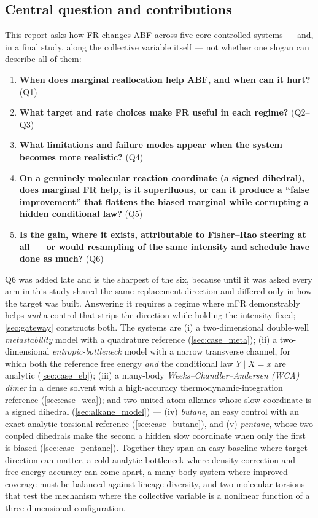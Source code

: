 \subsection{Central question and contributions}
This report asks how FR changes ABF across five core controlled systems --- and, in a
final study, along the collective variable itself --- not
whether one slogan can describe all of them:
\begin{enumerate}
  \item \textbf{When does marginal reallocation help ABF, and when can it hurt?}
        (Q1)
  \item \textbf{What target and rate choices make FR useful in each regime?}
        (Q2--Q3)
  \item \textbf{What limitations and failure modes appear when the system becomes
        more realistic?} (Q4)
  \item \textbf{On a genuinely molecular reaction coordinate (a signed dihedral),
        does marginal FR help, is it superfluous, or can it produce a ``false
        improvement'' that flattens the biased marginal while corrupting a hidden
        conditional law?} (Q5)
  \item \textbf{Is the gain, where it exists, attributable to Fisher--Rao steering at
        all --- or would resampling of the same intensity and schedule have done as
        much?} (Q6)
\end{enumerate}
Q6 was added late and is the sharpest of the six, because until it was asked every arm in
this study shared the same replacement direction and differed only in how the target was
built. Answering it requires a regime where mFR demonstrably helps \emph{and} a control
that strips the direction while holding the intensity fixed; \cref{sec:gateway} constructs
both.
The systems are (i) a two-dimensional double-well \emph{metastability} model
with a quadrature reference (\cref{sec:case_meta}); (ii) a two-dimensional
\emph{entropic-bottleneck} model with a narrow transverse channel, for which both
the reference free energy \emph{and} the conditional law $Y\mid X=x$ are analytic
(\cref{sec:case_eb}); (iii) a many-body \emph{Weeks--Chandler--Andersen
(WCA) dimer} in a dense solvent with a high-accuracy thermodynamic-integration
reference (\cref{sec:case_wca}); and two united-atom alkanes whose slow coordinate
is a signed dihedral (\cref{sec:alkane_model}) --- (iv) \emph{butane}, an easy
control with an exact analytic torsional reference (\cref{sec:case_butane}), and
(v) \emph{pentane}, whose two coupled dihedrals make the second a hidden slow
coordinate when only the first is biased (\cref{sec:case_pentane}). Together they
span an easy baseline where target direction can matter, a cold analytic bottleneck
where density correction and free-energy accuracy can come apart, a many-body system
where improved coverage must be balanced against lineage diversity, and two
molecular torsions that test the mechanism where the collective variable is a
nonlinear function of a three-dimensional configuration.

